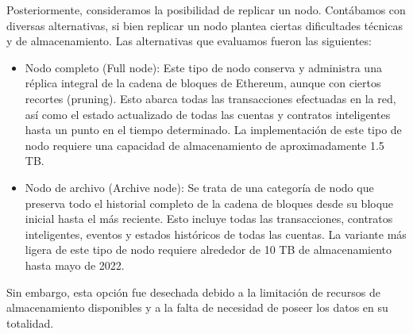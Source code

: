 \documentclass{article}
\begin{document}
Posteriormente, consideramos la posibilidad de replicar un nodo. Contábamos con diversas alternativas, si bien replicar un nodo plantea ciertas dificultades técnicas y de almacenamiento. Las alternativas que evaluamos fueron las siguientes:
\begin{itemize}
    \item Nodo completo (Full node): Este tipo de nodo conserva y administra una réplica integral de la cadena de bloques de Ethereum, aunque con ciertos recortes (pruning). Esto abarca todas las transacciones efectuadas en la red, así como el estado actualizado de todas las cuentas y contratos inteligentes hasta un punto en el tiempo determinado. La implementación de este tipo de nodo requiere una capacidad de almacenamiento de aproximadamente 1.5 TB.
    \item Nodo de archivo (Archive node): Se trata de una categoría de nodo que preserva todo el historial completo de la cadena de bloques desde su bloque inicial hasta el más reciente. Esto incluye todas las transacciones, contratos inteligentes, eventos y estados históricos de todas las cuentas. La variante más ligera de este tipo de nodo requiere alrededor de 10 TB de almacenamiento hasta mayo de 2022.
\end{itemize}
Sin embargo, esta opción fue desechada debido a la limitación de recursos de almacenamiento disponibles y a la falta de necesidad de poseer los datos en su totalidad.
\end{document}
